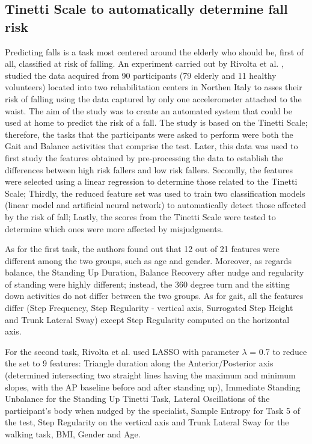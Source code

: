 \subsection{Tinetti Scale to automatically determine fall risk}
Predicting falls is a task most centered around the elderly who should be, first of all, classified at risk of falling. An experiment carried out by Rivolta et al. \cite{TinettiScale}, studied the data acquired from 90 participants (79 elderly and 11 healthy volunteers) located into two rehabilitation centers in Northen Italy to asses their risk of falling using the data captured by only one accelerometer attached to the waist. The aim of the study was to create an automated system that could be used at home to predict the risk of a fall.
The study is based on the Tinetti Scale; therefore, the tasks that the participants were asked to perform were both the Gait and Balance activities that comprise the test. Later, this data was used to first study the features obtained by pre-processing the data to establish the differences between high risk fallers and low risk fallers. Secondly, the features were selected using a linear regression to determine those related to the Tinetti Scale; Thirdly, the reduced feature set was used to train two classification models (linear model and artificial neural network) to automatically detect those affected by the risk of fall; Lastly, the scores from the Tinetti Scale were tested to determine which ones were more affected by misjudgments. 

As for the first task, the authors found out that 12 out of 21 features were different among the two groups, such as age and gender. 
Moreover, as regards balance, the Standing Up Duration, Balance Recovery after nudge and regularity of standing were highly different; instead, the 360 degree turn and the sitting down activities do not differ between the two groups.
As for gait, all the features differ (Step Frequency, Step Regularity - vertical axis, Surrogated Step Height and Trunk Lateral Sway) except Step Regularity computed on the horizontal axis. 

For the second task, Rivolta et al. used LASSO with parameter $\lambda$ = 0.7 to reduce the set to 9 features: Triangle duration along the Anterior/Posterior axis (determined intersecting two straight lines having the maximum and minimum slopes, with the
AP baseline before and after standing up),  Immediate Standing Unbalance for the Standing Up Tinetti Task, Lateral Oscillations of the participant's body when nudged by the specialist, Sample Entropy for Task 5 of the test,  Step Regularity on the vertical axis and Trunk Lateral Sway for the walking task, BMI, Gender and Age.

